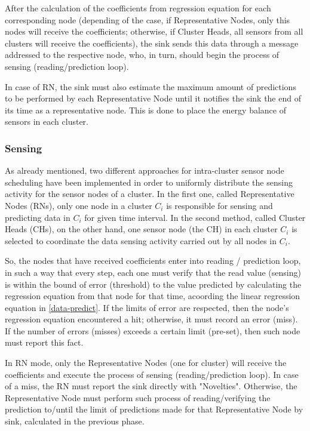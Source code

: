 \documentclass[conference]{IEEEtran}
\begin{document}
After the calculation of the coefficients from regression equation for each
corresponding node (depending of the case, if Representative Nodes, only this
nodes will receive the coefficients; otherwise, if Cluster Heads, all sensors
from all clusters will receive the coefficients), the sink sends this data
through a message addressed to the respective node, who, in turn, should begin
the process of sensing (reading/prediction loop).

In case of RN, the sink must also estimate the maximum amount of predictions to
be performed by each Representative Node until it notifies the sink the end of
its time as a representative node. This is done to place the energy balance of
sensors in each cluster.

 
\subsubsection{Sensing}

As already mentioned, two different approaches for intra-cluster sensor node
scheduling have been implemented in order to uniformly distribute the sensing
activity for the sensor nodes of a cluster. In the first one, called
Representative Nodes (RNs), only one node in a cluster $C_{i}$ is responsible
for sensing and predicting data in $C_{i}$ for given time interval. In the
second method, called Cluster Heads (CHs), on the other hand, one sensor node
(the CH) in each cluster $C_{i}$ is selected to coordinate the data sensing
activity carried out by all nodes in $C_{i}$.

So, the nodes that have received coefficients enter into reading / prediction
loop, in such a way that every step, each one must verify that the read value
(sensing) is within the bound of error (threshold) to the value
predicted by calculating the regression equation from that node for that time,
acoording the linear regression equation in \ref{data-predict}.
If the limits of error are respected, then the node's regression equation
encountered a hit; otherwise, it must record an error (miss). If the number of
errors (misses) exceeds a certain limit (pre-set), then such node must report
this fact.

In RN mode, only the Representative Nodes (one for cluster) will receive the
coefficients and execute the process of sensing (reading/prediction loop).
In case of a miss, the RN must report the sink directly with "Novelties".
Otherwise, the Representative Node must perform such process of
reading/verifying the prediction to/until the limit of predictions made for
that Representative Node by sink, calculated in the previous phase.
\end{document}
